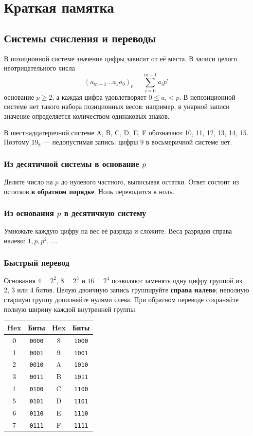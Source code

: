 \chapter{Краткая памятка}

\section{Системы счисления и переводы}
В позиционной системе значение цифры зависит от её места. В записи целого неотрицательного числа
\[
    (a_{m-1}\ldots a_1a_0)_p=\sum_{i=0}^{m-1}a_i p^i
\]
основание $p\ge2$, а каждая цифра удовлетворяет $0\le a_i<p$. В непозиционной системе нет такого набора позиционных весов: например, в унарной записи значение определяется количеством одинаковых знаков.

В шестнадцатеричной системе A, B, C, D, E, F обозначают 10, 11, 12, 13, 14, 15. Поэтому $19_8$ --- недопустимая запись: цифры 9 в восьмеричной системе нет.

\subsection*{Из десятичной системы в основание $p$}
Делите число на $p$ до нулевого частного, выписывая остатки. Ответ состоит из остатков \textbf{в обратном порядке}. Ноль переводится в ноль.

\subsection*{Из основания $p$ в десятичную систему}
Умножьте каждую цифру на вес её разряда и сложите. Веса разрядов справа налево: $1, p, p^2, \ldots$.

\subsection*{Быстрый перевод}
Основания $4=2^2$, $8=2^3$ и $16=2^4$ позволяют заменять одну цифру группой из 2, 3 или 4 битов. Целую двоичную запись группируйте \textbf{справа налево}; неполную старшую группу дополняйте нулями слева. При обратном переводе сохраняйте полную ширину каждой внутренней группы.

\begin{center}
\begin{tabular}{c|c@{\qquad}c|c}
Hex & Биты & Hex & Биты\\\hline
0 & \texttt{0000} & 8 & \texttt{1000}\\
1 & \texttt{0001} & 9 & \texttt{1001}\\
2 & \texttt{0010} & A & \texttt{1010}\\
3 & \texttt{0011} & B & \texttt{1011}\\
4 & \texttt{0100} & C & \texttt{1100}\\
5 & \texttt{0101} & D & \texttt{1101}\\
6 & \texttt{0110} & E & \texttt{1110}\\
7 & \texttt{0111} & F & \texttt{1111}
\end{tabular}
\end{center}


